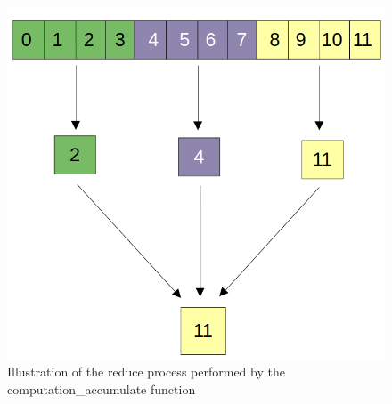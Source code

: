 \documentclass[10pt]{article}
\begin{document}
\begin{multicols}{2}
\begin{figure}[H]
  \includegraphics[scale=0.2]{reduce-example.png}
  \centering
  \caption{Illustration of the reduce process performed by the computation\_accumulate function}
\end{figure}

\end{multicols}



\end{document}
